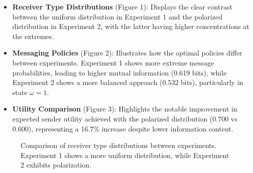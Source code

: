 \documentclass[12pt]{article}
\theoremstyle{plain}
\theoremstyle{definition}
\theoremstyle{remark}
\begin{document}
\begin{itemize}
    \item \textbf{Receiver Type Distributions} (Figure 1): Displays the clear contrast between the uniform distribution in Experiment 1 and the polarized distribution in Experiment 2, with the latter having higher concentrations at the extremes.
    
    \item \textbf{Messaging Policies} (Figure 2): Illustrates how the optimal policies differ between experiments. Experiment 1 shows more extreme message probabilities, leading to higher mutual information (0.619 bits), while Experiment 2 shows a more balanced approach (0.532 bits), particularly in state $\omega=1$.
    
    \item \textbf{Utility Comparison} (Figure 3): Highlights the notable improvement in expected sender utility achieved with the polarized distribution (0.700 vs 0.600), representing a 16.7\% increase despite lower information content.
\end{itemize}

\begin{figure}[htbp]
\centering
{}
\caption{Comparison of receiver type distributions between experiments. Experiment 1 shows a more uniform distribution, while Experiment 2 exhibits polarization.}
\label{fig:type-distributions}
\end{figure}
\end{document}
